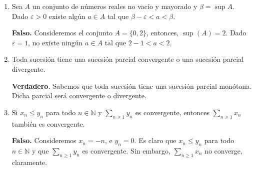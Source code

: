 \documentclass[10pt,a4paper]{article}
\begin{document}
\begin{enumerate}
		\item Sea $A$ un conjunto de números reales no vacío y mayorado y $\beta = \sup A$. Dado $\varepsilon > 0$ existe algún $a \in A$ tal que $\beta - \varepsilon < a < \beta$.
		
		\textbf{Falso. }Consideremos el conjunto $A = \{0, 2\}$, entonces, $\sup(A) = 2$. Dado $\varepsilon = 1$, no existe ningún $a \in A$ tal que $2 - 1 < a < 2$. \newline
		
		\item Toda sucesión tiene una sucesión parcial convergente o una sucesión parcial divergente.
		
		\textbf{Verdadero. }Sabemos que toda sucesión tiene una sucesión parcial monótona. Dicha parcial será convergente o divergente. \newline
		
		\item Si $x_n \leq y_n$ para todo $n \in \mathbb{N}$ y $\displaystyle \sum_{n \geq 1} y_n$ es convergente, entonces $\displaystyle \sum_{n \geq 1}x_n$ también es convergente.
		
		\textbf{Falso. }Consideremos $x_n = -n$, e $y_n = 0$. Es claro que $x_n \leq y_n$ para todo $n \in \mathbb{N}$ y que $\displaystyle \sum_{n \geq 1} y_n$ es convergente. Sin embargo, $\displaystyle \sum_{n \geq 1}x_n$ no converge, claramente.
	\end{enumerate}
\end{document}
